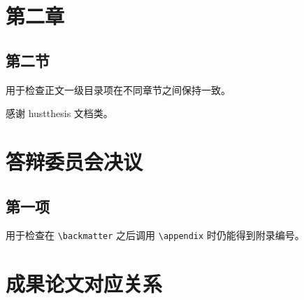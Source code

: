 \documentclass[type=doctor]{hustthesis} %
\begin{document}
\chapter{第二章}

\section{第二节}

用于检查正文一级目录项在不同章节之间保持一致。

\backmatter

\begin{acknowledgements} %
  感谢 hustthesis 文档类。
\end{acknowledgements}

\printbibliography

\appendix

\chapter{答辩委员会决议}

\section{第一项}

用于检查在 \verb|\backmatter| 之后调用 \verb|\appendix| 时仍能得到附录编号。

\chapter{成果论文对应关系}
\end{document}
